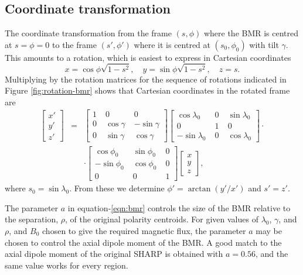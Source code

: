 \documentclass[twoside,12pt]{book}
\begin{document}
\subsection{Coordinate transformation}
The coordinate transformation from the frame $(s,\phi)$ where the BMR is centred at $s=\phi=0$ to the frame $(s',\phi')$ where it is centred at $(s_0,\phi_0)$ with tilt $\gamma$. This amounts to a rotation, which is easiest to express in Cartesian coordinates
\begin{equation}
x = \cos\phi\sqrt{1-s^2}, \quad y=\sin\phi\sqrt{1-s^2},\quad z=s.
\end{equation}
Multiplying by the rotation matrices for the sequence of rotations indicated in Figure \ref{fig:rotation-bmr} shows that Cartesian coordinates in the rotated frame are
\begin{eqnarray}\nonumber
\left[
\begin{array}{c}
x'\\
y'\\
z'
\end{array}
\right] &=&
\left[
\begin{array}{ccc}
1\; & 0\; & 0\\
0\; & \cos\gamma\; & -\sin\gamma\\
0\; & \sin\gamma\; & \cos\gamma
\end{array}
\right]
\left[
\begin{array}{ccc}
\cos\lambda_0\; & 0\; & \sin\lambda_0\\
0\; & 1\; & 0\\
-\sin\lambda_0\; & 0\; & \cos\lambda_0
\end{array}
\right]
\cdot\\ 
&&\cdot
\left[
\begin{array}{ccc}
\cos\phi_0\; & \sin\phi_0\; & 0\\
-\sin\phi_0\; & \cos\phi_0\; & 0\\
0 & 0 & 1
\end{array}
\right]
\left[
\begin{array}{c}
x\\
y\\
z
\end{array}
\right],
\label{eqn:rotation-trans}
\end{eqnarray}
where $s_0=\sin\lambda_0$. From these we determine $\phi'=\arctan(y'/x')$ and $s' = z'$.

The parameter $a$ in equation-\ref{eqn:bmr} controls the size of the BMR relative to the separation, $\rho$, of the original polarity centroids. For given values of $\lambda_0$, $\gamma$, and $\rho$, and $B_0$ chosen to give the required magnetic flux, the parameter $a$ may be chosen to control the axial dipole moment of the BMR. A good match to the axial dipole moment of the original SHARP is obtained with $a=0.56$, and the same value works for every region.
\end{document}
